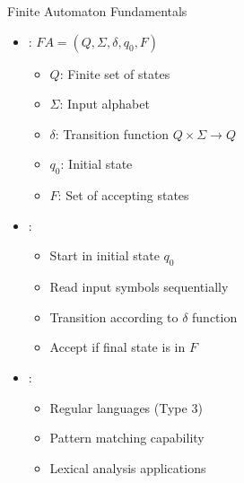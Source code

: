 \begin{frame}{Finite Automaton Fundamentals}
\begin{itemize}
\item {}: $FA = (Q, \Sigma, \delta, q_0, F)$
\begin{itemize}
\item $Q$: Finite set of states
\item $\Sigma$: Input alphabet
\item $\delta$: Transition function $Q \times \Sigma \rightarrow Q$
\item $q_0$: Initial state
\item $F$: Set of accepting states
\end{itemize}
\vspace{0.5cm}
\item {}:
\begin{itemize}
\item Start in initial state $q_0$
\item Read input symbols sequentially
\item Transition according to $\delta$ function
\item Accept if final state is in $F$
\end{itemize}
\vspace{0.3cm}
\item {}:
\begin{itemize}
\item Regular languages (Type 3)
\item Pattern matching capability
\item Lexical analysis applications
\end{itemize}
\end{itemize}
\end{frame}
